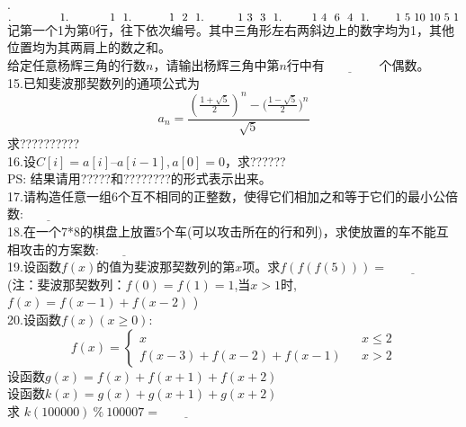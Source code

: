 . \\
$
.\qquad \ \ \ \ \ \ \ 1 \\
.\qquad \ \ \ \ \ 1 \ \ 1 \\
.\qquad \ \ \ \ 1 \ \ 2\ \ 1 \\
.\qquad \ \ \ 1 \ 3 \ \ 3\ \ 1 \\
.\qquad \ \ 1 \ 4\ \ 6\ \ 4 \ \ 1 \\
.\qquad \ 1\ 5\ 10\ 10\  5\ 1 \\
$
记第一个1为第0行，往下依次编号。其中三角形左右两斜边上的数字均为1，其他位置均为其两肩上的数之和。 \\
给定任意杨辉三角的行数$n$，请输出杨辉三角中第$n$行中有$\underline{\qquad \qquad }$ 个偶数。 \\

\noindent 15.已知斐波那契数列的通项公式为
$$
a_{n}=\frac{{({\frac{1+\sqrt 5}{2}})^{n} - ({\frac{1-\sqrt 5}{2}}})^{n}}{\sqrt 5}
$$
求?????????? \\

\noindent 16.设$C[i] = a[i] – a[i-1], a[0] = 0$，求?????? \\
PS: 结果请用?????和????????的形式表示出来。\\

\noindent 17.请构造任意一组6个互不相同的正整数，使得它们相加之和等于它们的最小公倍数:$\underline{\qquad \qquad }$ \\

\noindent 18.在一个7*8的棋盘上放置5个车(可以攻击所在的行和列)，求使放置的车不能互相攻击的方案数:$\underline{\qquad \qquad }$ \\

\noindent 19.设函数$f(x)$的值为斐波那契数列的第$x$项。求$f(f(f(5)))= \underline{\qquad \qquad }$\\
(注：斐波那契数列：$f(0)= f(1) = 1$,当$x > 1$时, $f(x) = f(x-1) + f(x-2)$ ) \\

\noindent 20.设函数$f(x)(x \geq 0):$
$$ f(x)=\left\{
\begin{aligned}
x \ \ \ \ \ \ \ \ \ \ &  & x \leq 2 \\
f(x-3)+f(x-2)+f(x-1) &  & x > 2 
\end{aligned}
\right.
$$
设函数$g(x) = f(x) + f(x+1) + f(x+2)$\\
设函数$k(x) = g(x) + g(x+1) + g(x+2)$ \\
求 $k(100000)\ \%\ 100007 = \underline{\qquad \qquad }$ \\

